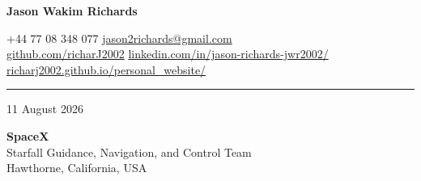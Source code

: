 \documentclass[10pt,a4paper]{article}
\newcommand{\NameSize}{20pt}
\newcommand{\ContactSize}{8pt}
\newcommand{\MetaSize}{8.8pt}
\newcommand{\NameLineSize}{20pt}
\newcommand{\KeywordLineSize}{9pt}
\newcommand{\ContactLineSize}{8pt}
\newcommand{\MetaLineSize}{10.5pt}
\newcommand{\HeaderContactToLine}{2pt}
\newcommand{\HeaderLineToDate}{8pt}
\newcommand{\DateAfter}{22pt}             %
\newcommand{\HeaderLineThickness}{0.5pt}
\begin{document}

\begin{center}



    {
        \fontsize{\NameSize}{\NameLineSize}\selectfont
        \textbf{\textcolor{CVBlack}{Jason Wakim Richards}}
    }


    \vspace{\KeywordLineSize}

    {
        \fontsize{\ContactSize}{\ContactLineSize}
        \selectfont
        \textcolor{CVBlack}
        {
            +44 77 08 348 077
            \quad\textbar\quad
            \href{mailto:jason2richards@gmail.com}{jason2richards@gmail.com}
            \\
            \href{https://github.com/richarJ2002}{github.com/richarJ2002}
            \quad\textbar\quad
            \href{https://www.linkedin.com/in/jason-richards-jwr2002/}
            {linkedin.com/in/jason-richards-jwr2002/}
            \quad\textbar\quad
            \href{https://richarj2002.github.io/personal_website/}{richarj2002.github.io/personal\_website/}
        }
    }

\end{center}

\vspace{\HeaderContactToLine}
\noindent\textcolor{CVBlack}{\rule{\textwidth}{\HeaderLineThickness}}


\vspace{\HeaderLineToDate}

{\fontsize{\MetaSize}{\MetaLineSize}\selectfont
    \textcolor{CVGray}{11 August 2026}}

\vspace{\DateAfter}

{\fontsize{\MetaSize}{\MetaLineSize}\selectfont
    \textbf{\textcolor{CVBlack}{SpaceX}}\\
    \textcolor{CVDarkGray}{Starfall Guidance, Navigation, and Control Team}\\
    \textcolor{CVDarkGray}{Hawthorne, California, USA}}
\end{document}
